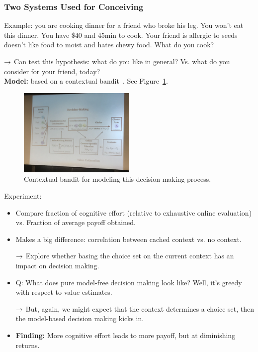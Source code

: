 \subsubsection{Two Systems Used for Conceiving}

Example: you are cooking dinner for a friend who broke his leg. You won't eat this dinner. You have \$40 and 45min to cook. Your friend is allergic to seeds doesn't like food to moist and hates chewy food. What do you cook?

$\rightarrow$ Can test this hypothesis: what do you like in general? Vs. what do you consider for your friend, today? \\

{\bf Model:} based on a contextual bandit~\cite{li2010contextual}. See Figure~\ref{fig:cb}.

\begin{figure}[h!]
    \centering
    \includegraphics[width=0.5\textwidth]{images/cb.JPG}
    \caption{Contextual bandit for modeling this decision making process.}
    \label{fig:cb}
\end{figure}

Experiment:
\begin{itemize}
    \item Compare fraction of cognitive effort (relative to exhaustive online evaluation) vs. Fraction of average payoff obtained.
    \item Makes a big difference: correlation between cached context vs. no context.
    
    $\rightarrow$ Explore whether basing the choice set on the current context has an impact on decision making.
    
    \item Q: What does pure model-free decision making look like? Well, it's greedy with respect to value estimates.
    
    $\rightarrow$ But, again, we might expect that the context determines a choice set, then the model-based decision making kicks in.
    
    \item {\bf Finding:} More cognitive effort leads to more payoff, but at diminishing returns.
\end{itemize}

